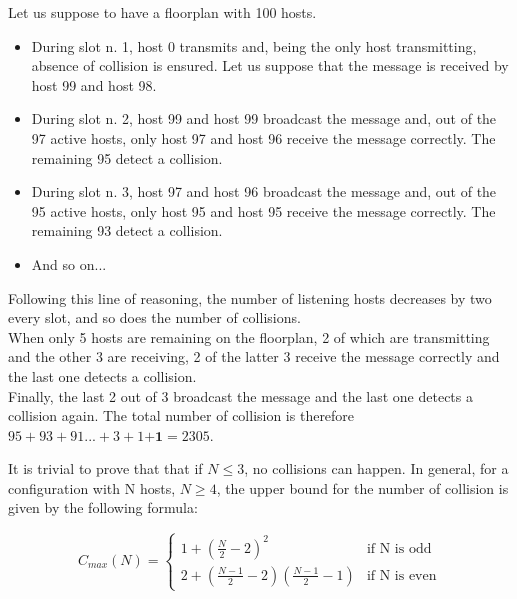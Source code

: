 \hfill \break
Let us suppose to have a floorplan with 100 hosts.\\
\begin{itemize}
	\item
	During slot n. 1, host 0 transmits and, being the only host transmitting, absence of collision is ensured. Let us suppose that the message is received by host 99 and host 98.
	\item
	During slot n. 2, host 99 and host 99 broadcast the message and, out of the 97 active hosts, only host 97 and host 96 receive the message correctly. The remaining 95 detect a collision.
	\item
	During slot n. 3, host 97 and host 96 broadcast the message and, out of the 95 active hosts, only host 95 and host 95 receive the message correctly. The remaining 93 detect a collision.
	\item
	And so on...

\end{itemize}
\hfill \break
Following this line of reasoning, the number of listening hosts decreases by two every slot, and so does the number of collisions.\\
When only 5 hosts are remaining on the floorplan, 2 of which are transmitting and the other 3 are receiving, 2 of the latter 3 receive the message correctly and the last one detects a collision.\\
Finally, the last 2 out of 3 broadcast the message and the last one detects a collision again.
\hfill \break
The total number of collision is therefore $95+93+91...+3+1\textbf{+1} = 2305$.

\hfill \break
It is trivial to prove that that if $N \leq 3$, no collisions can happen.
\hfill \break
In general, for a configuration with N hosts, $N \geq 4$, the upper bound for the number of collision is given by the following formula:

\begin{equation}
\label{eq:collisionUpperBound}
	C_{max}(N) = \begin{cases}
	1+(\frac{N}{2}-2)^2 &\text{if N is odd}\\
	2+(\frac{N-1}{2} - 2)(\frac{N-1}{2}-1) &\text{if N is even}
	\end{cases}
\end{equation}
